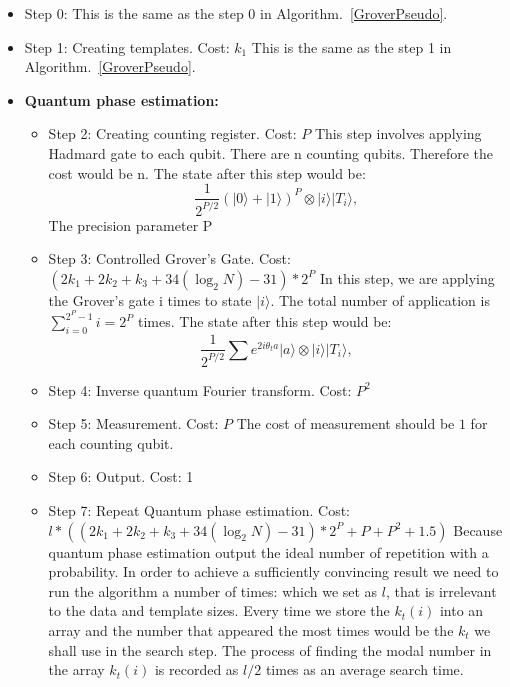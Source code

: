 \documentclass[aps,prd,nofootinbib,twocolumn,reprint,superscriptaddress,showpacs,showkeys,longbibliography]{revtex4-1}
\newcommand{\ket}[1]{|#1\rangle}
\begin{document}
\begin{itemize}
    \item Step 0:  This is the same as the step 0 in Algorithm.~\ref{GroverPseudo}.
    \item Step 1: Creating templates. Cost: $k_1$
               \newline This is the same as the step 1 in Algorithm.~\ref{GroverPseudo}.
    \item  \textbf{Quantum phase estimation:} 
        \begin{itemize}
        \item Step 2: Creating counting register. Cost: $P$ 
        \newline This step involves applying Hadmard gate to each qubit. There are n counting qubits. Therefore the cost would be n. The state after this step would be:
                \begin{equation}
                \label{step2}
                \frac{1}{2^{P/2}}(\ket{0}+\ket{1})^P\otimes\ket{i}\ket{T_i},
                \end{equation}
        The precision parameter P
        \item Step 3: Controlled Grover's Gate. Cost: $(2k_1+2k_2+k_3+34(\log_2 N)-31)*2^{P}$ 
        \newline In this step, we are applying the Grover's gate i times to state $\ket{i}$. The total number of application is $\sum^{2^P-1}_{i=0} i=2^P$ times. The state after this step would be:
                \begin{equation}
                \label{step3A2}
                \frac{1}{2^{P/2}}\sum e^{2i\theta_t a}\ket{a}\otimes\ket{i}\ket{T_i},
                \end{equation}
        \item Step 4: Inverse quantum Fourier transform. Cost: $P^2$ \cite{barnett2009quantum}
        \item Step 5: Measurement. Cost: $P$
        \newline The cost of measurement should be $1$ for each counting qubit.
        \item Step 6: Output. Cost: 1
        \item Step 7: Repeat Quantum phase estimation. \newline Cost: $l*((2k_1+2k_2+k_3+34(\log_2 N)-31)*2^{P}+P+P^2+1.5)$
        \newline Because quantum phase estimation output the ideal number of repetition with a probability. In order to achieve a sufficiently convincing result we need to run the algorithm a number of times: which we set as $l$, that is irrelevant to the data and template sizes. Every time we store the $k_t(i)$ into an array and the number that appeared the most times would be the $k_t$ we shall use in the search step. The process of finding the modal number in the array $k_t(i)$ is recorded as $l/2$ times as an average search time.

\end{itemize}
\end{itemize}
\end{document}
